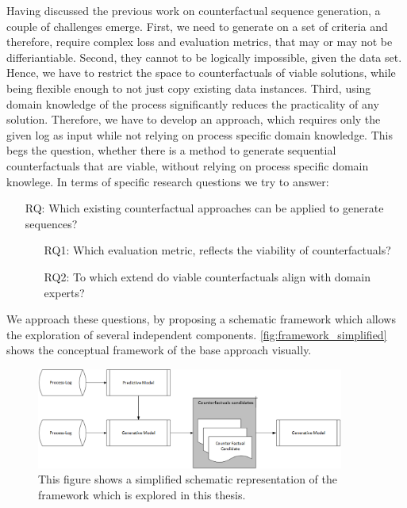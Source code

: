 \documentclass[./../../paper.tex]{subfiles}
\begin{document}
Having discussed the previous work on counterfactual sequence generation, a couple of challenges emerge. 
First, we need to generate on a set of criteria and therefore, require complex loss and evaluation metrics, that may or may not be differiantiable. Second, they cannot to be logically impossible, given the data set. 
Hence, we have to restrict the space to counterfactuals of viable solutions, while being flexible enough to not just copy existing data instances. 
Third, using domain knowledge of the process significantly reduces the practicality of any solution. Therefore, we have to develop an approach, which requires only the given log as input while not relying on process specific domain knowledge. This begs the question, whether there is a method to generate sequential counterfactuals that are viable, without relying on process specific domain knowlege. In terms of specific research questions we try to answer:

\begin{itemize}
    \item[RQ:] Which existing counterfactual approaches can be applied to generate sequences?
    \begin{itemize}
        \item[RQ1:] Which evaluation metric, reflects the viability of counterfactuals?
        \item[RQ2:] To which extend do viable counterfactuals align with domain experts?  
    \end{itemize}
\end{itemize}

\noindent We approach these questions, by proposing a schematic framework which allows the exploration of several independent components. \autoref{fig:framework_simplified} shows the conceptual framework of the base approach visually.

\begin{figure}[htb]
    \label{fig:framework_simplified}
    \centering
    \includegraphics[width=0.9\textwidth]{figures/framework_simplified.png}
    \caption{This figure shows a simplified schematic representation of the framework which is explored in this thesis.}
\end{figure}
\end{document}
